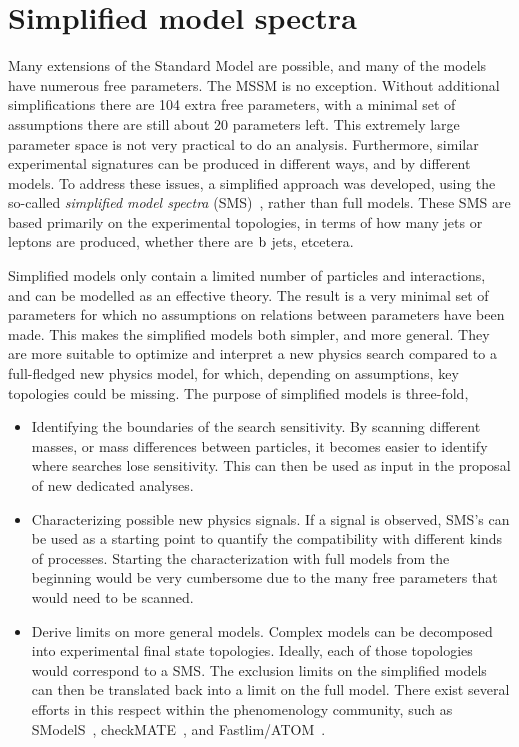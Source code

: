 
\section{Simplified model spectra \label{sec:susy_sms}}

Many extensions of the Standard Model are possible, and many of the models have numerous free
parameters. The MSSM is no exception. Without additional simplifications there are 104 extra free
parameters, with a minimal set of assumptions there are still about 20 parameters left. This
extremely large parameter space is not very practical to do an analysis. 
Furthermore, similar experimental signatures can be produced in different ways, and by different
models.
To address these issues, a simplified approach was developed, using the so-called
\textit{simplified model spectra} (SMS)~\cite{Alves:2011wf,Alwall:2008ag,Chatrchyan:2013sza},
rather than full models. These SMS are based primarily on the experimental topologies, in terms of
how many jets or leptons are produced, whether there are $\mathrm{b}$ jets, etcetera. 

Simplified models only contain a limited number of particles and interactions, and can be modelled
as an effective theory. 
The result is a very minimal set of parameters for which no assumptions on relations between
parameters have been made. This makes the simplified models both simpler, and more general.
They are more suitable to optimize and interpret a new physics search compared to a full-fledged
new physics model, for which, depending on assumptions, key topologies could be missing.
The purpose of simplified models is three-fold,
\begin{itemize}
  \item Identifying the boundaries of the search sensitivity. By scanning different masses, or mass
differences between particles, it becomes easier to identify where searches lose sensitivity. This
can then be used as input in the proposal of new dedicated analyses. 

  \item Characterizing possible new physics signals. If a signal is observed, SMS's can be used as
a starting point to quantify the compatibility with different kinds of processes. Starting the
characterization with full models from the beginning would be very cumbersome due to the many free
parameters that would need to be scanned.

\item Derive limits on more general models. Complex models can be decomposed into experimental
final state topologies. Ideally, each of those topologies would correspond to a SMS. The exclusion
limits on the simplified models can then be translated back into a limit on the full model. There
exist several efforts in this respect within the phenomenology community, such as
SModelS~\cite{Kraml:2013mwa,Kraml:2014sna}, checkMATE~\cite{Kim:2015wza}, and
Fastlim/ATOM~\cite{Papucci:2014rja}.
\end{itemize}


